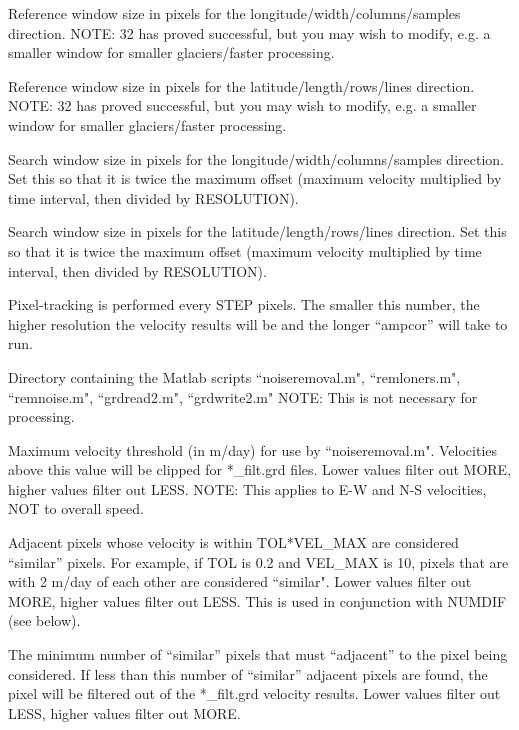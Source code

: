 \documentclass[12pt]{article}
\begin{document}
 Reference window size in pixels for the longitude/width/columns/samples direction.
NOTE: 32 has proved successful, but you may wish to modify, e.g. a smaller window for smaller glaciers/faster processing.

 Reference window size in pixels for the latitude/length/rows/lines direction.
NOTE: 32 has proved successful, but you may wish to modify, e.g. a smaller window for smaller glaciers/faster processing.

 Search window size in pixels for the longitude/width/columns/samples direction.
Set this so that it is twice the maximum offset (maximum velocity multiplied by time interval, then divided by RESOLUTION).

 Search window size in pixels for the latitude/length/rows/lines direction.
Set this so that it is twice the maximum offset (maximum velocity multiplied by time interval, then divided by RESOLUTION).

 Pixel-tracking is performed every STEP pixels.
The smaller this number, the higher resolution the velocity results will be and the longer ``ampcor'' will take to run.

 Directory containing the Matlab scripts ``noiseremoval.m", ``remloners.m", ``remnoise.m", ``grdread2.m", ``grdwrite2.m"
NOTE: This is not necessary for processing.

 Maximum velocity threshold (in m/day) for use by ``noiseremoval.m".
Velocities above this value will be clipped for *\_filt.grd files.
Lower values filter out MORE, higher values filter out LESS.
NOTE: This applies to E-W and N-S velocities, NOT to overall speed.

 Adjacent pixels whose velocity is within TOL*VEL\_MAX are considered  ``similar'' pixels.
For example, if TOL is 0.2 and VEL\_MAX is 10, pixels that are with 2 m/day of each other are considered ``similar".
Lower values filter out MORE, higher values filter out LESS.
This is used in conjunction with NUMDIF (see below).

 The minimum number of ``similar'' pixels that must ``adjacent'' to the pixel being considered.
If less than this number of ``similar'' adjacent pixels are found, the pixel will be filtered out of the *\_filt.grd velocity results.
Lower values filter out LESS, higher values filter out MORE.
\end{document}
